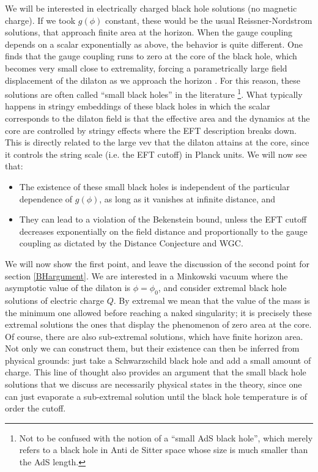 \documentclass[11pt]{article}
\numberwithin{equation}{section}
\numberwithin{equation}{section}
\theoremstyle{remark}
\begin{document}
We will be interested in electrically charged black hole solutions (no magnetic charge). If we took $g(\phi)$ constant, these would be the usual Reissner-Nordstrom solutions, that approach finite area at the horizon. When the gauge coupling depends on a scalar exponentially as above, the behavior is quite different. One finds that the gauge coupling runs to zero at the core of the black hole, which becomes very small close to extremality, forcing a parametrically large field displacement of the dilaton as we approach the horizon \cite{Garfinkle:1990qj}. For this reason, these solutions are often called ``small black holes'' in the literature \cite{Sen:1995in,Sen:1994eb}\footnote{Not to be confused with the notion of a ``small AdS black hole'', which merely refers to a black hole in Anti de Sitter space whose size is much smaller than the AdS length.}. What typically happens in stringy embeddings of these black holes in which the scalar corresponds to the dilaton field is that the effective area and the dynamics at the core are controlled by stringy effects where the EFT description breaks down. This is directly related to the large vev that the dilaton attains at the core, since it controls the string scale (i.e. the EFT cutoff) in Planck units. We will now see that:\begin{itemize}
\item The existence of these small black holes is independent of the particular dependence of $g(\phi)$, as long as it vanishes at infinite distance, and
\item They can lead to a violation of the Bekenstein bound, unless the EFT cutoff decreases exponentially on the field distance and proportionally to the gauge coupling as dictated by the Distance Conjecture and WGC.
\end{itemize}

We will now show the first point, and leave the discussion of the second point for section \ref{BHargument}. 
We are interested in a Minkowski vacuum where the asymptotic value of the dilaton is
$\phi=\phi_0$,
and consider extremal black hole solutions of electric charge $Q$. By extremal we mean that the value of the mass is the minimum one allowed before reaching a naked singularity; it is precisely these extremal solutions the ones that display the phenomenon of zero area at the core. Of course, there are also sub-extremal solutions, which have finite horizon area. Not only we can construct them, but their existence can then be inferred from physical grounds: just take a Schwarzschild black hole and add a small amount of charge. This line of thought also provides an argument that the small black hole solutions that we discuss are necessarily physical states in the theory, since one can just evaporate a sub-extremal solution until the black hole temperature is of order the cutoff.
\end{document}
